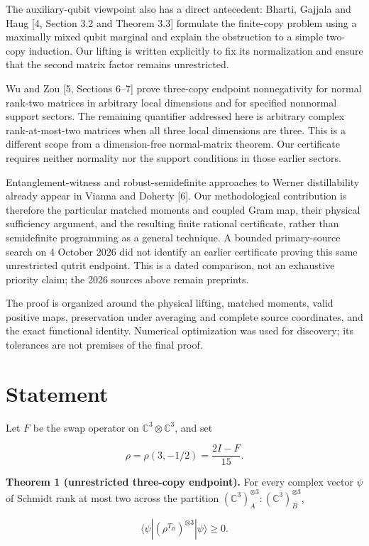 \documentclass[
  11pt,
]{article}
\begin{document}
The auxiliary-qubit viewpoint also has a direct antecedent: Bharti,
Gajjala and Haug {[}4, Section 3.2 and Theorem 3.3{]} formulate the
finite-copy problem using a maximally mixed qubit marginal and explain
the obstruction to a simple two-copy induction. Our lifting is written
explicitly to fix its normalization and ensure that the second matrix
factor remains unrestricted.

Wu and Zou {[}5, Sections 6--7{]} prove three-copy endpoint
nonnegativity for normal rank-two matrices in arbitrary local dimensions
and for specified nonnormal support sectors. The remaining quantifier
addressed here is arbitrary complex rank-at-most-two matrices when all
three local dimensions are three. This is a different scope from a
dimension-free normal-matrix theorem. Our certificate requires neither
normality nor the support conditions in those earlier sectors.

Entanglement-witness and robust-semidefinite approaches to Werner
distillability already appear in Vianna and Doherty {[}6{]}. Our
methodological contribution is therefore the particular matched moments
and coupled Gram map, their physical sufficiency argument, and the
resulting finite rational certificate, rather than semidefinite
programming as a general technique. A bounded primary-source search on 4
October 2026 did not identify an earlier certificate proving this same
unrestricted qutrit endpoint. This is a dated comparison, not an
exhaustive priority claim; the 2026 sources above remain preprints.

The proof is organized around the physical lifting, matched moments,
valid positive maps, preservation under averaging and complete source
coordinates, and the exact functional identity. Numerical optimization
was used for discovery; its tolerances are not premises of the final
proof.

\section{Statement}\label{statement}

Let \(F\) be the swap operator on \(\mathbb C^3\otimes\mathbb C^3\), and
set

\[
\rho=\rho(3,-1/2)=\frac{2I-F}{15}.
\]

\textbf{Theorem 1 (unrestricted three-copy endpoint).} For every complex
vector \(\psi\) of Schmidt rank at most two across the partition
\((\mathbb C^3)^{\otimes3}_{A}:(\mathbb C^3)^{\otimes3}_{B}\),

\[
\langle\psi|(\rho^{T_B})^{\otimes3}|\psi\rangle\geq0.
\tag{1}
\]
\end{document}
